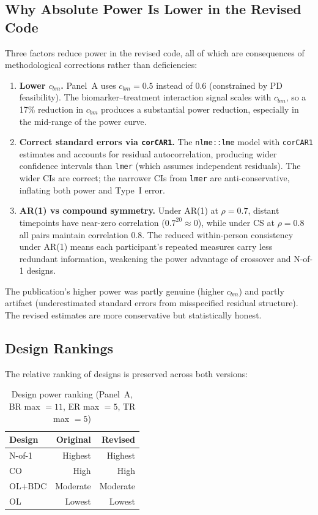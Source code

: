 \documentclass[11pt]{article}
\begin{document}
\subsection{Why Absolute Power Is Lower in the Revised Code}

Three factors reduce power in the revised code, all of
which are consequences of methodological corrections rather
than deficiencies:

\begin{enumerate}
\item \textbf{Lower $c_{bm}$.} Panel~A uses $c_{bm} = 0.5$
  instead of 0.6 (constrained by PD feasibility). The
  biomarker--treatment interaction signal scales with
  $c_{bm}$, so a 17\% reduction in $c_{bm}$ produces a
  substantial power reduction, especially in the mid-range
  of the power curve.

\item \textbf{Correct standard errors via \texttt{corCAR1}.}
  The \texttt{nlme::lme} model with \texttt{corCAR1}
  estimates and accounts for residual autocorrelation,
  producing wider confidence intervals than \texttt{lmer}
  (which assumes independent residuals). The wider CIs are
  correct; the narrower CIs from \texttt{lmer} are
  anti-conservative, inflating both power and Type~I error.

\item \textbf{AR(1) vs compound symmetry.} Under AR(1) at
  $\rho = 0.7$, distant timepoints have near-zero
  correlation ($0.7^{20} \approx 0$), while under CS at
  $\rho = 0.8$ all pairs maintain correlation 0.8. The
  reduced within-person consistency under AR(1) means each
  participant's repeated measures carry less redundant
  information, weakening the power advantage of crossover
  and N-of-1 designs.
\end{enumerate}

The publication's higher power was partly genuine (higher
$c_{bm}$) and partly artifact (underestimated standard
errors from misspecified residual structure). The revised
estimates are more conservative but statistically honest.

\subsection{Design Rankings}

The relative ranking of designs is preserved across both
versions:

\begin{table}[h]
\centering
\caption{Design power ranking (Panel~A, BR max $= 11$,
  ER max $= 5$, TR max $= 5$)}
\begin{tabular}{lrr}
\toprule
Design & Original & Revised \\
\midrule
N-of-1 & Highest & Highest \\
CO & High & High \\
OL+BDC & Moderate & Moderate \\
OL & Lowest & Lowest \\
\bottomrule
\end{tabular}
\end{table}
\end{document}

